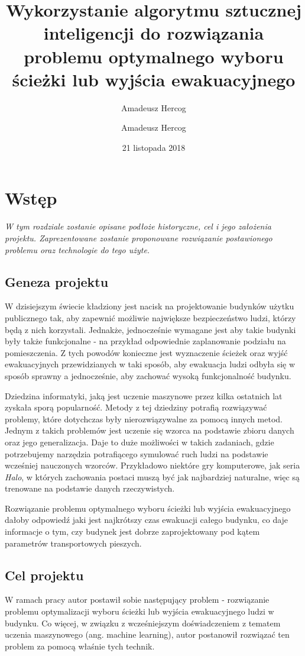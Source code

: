 \documentclass[12pt]{aghdpl}
\author{Amadeusz Hercog}
\title{Wykorzystanie algorytmu sztucznej inteligencji do rozwiązania problemu optymalnego wyboru ścieżki lub wyjścia ewakuacyjnego}
\author{Amadeusz Hercog}
\date{21 listopada 2018}
\begin{document}
	\titlepages
	
	\chapter{Wstęp}
	\textit{W tym rozdziale zostanie opisane podłoże historyczne, cel i jego założenia projektu. Zaprezentowane zostanie proponowane rozwiązanie postawionego problemu oraz technologie do tego użyte.}
	
		\section{Geneza projektu}	
		W dzisiejszym świecie kładziony jest nacisk na projektowanie budynków użytku publicznego tak, aby zapewnić możliwie największe bezpieczeństwo ludzi, którzy będą z nich korzystali. Jednakże, jednocześnie wymagane jest aby takie budynki były także funkcjonalne - na przykład odpowiednie zaplanowanie podziału na pomieszczenia. Z tych powodów konieczne jest wyznaczenie ścieżek oraz wyjść ewakuacyjnych przewidzianych w taki sposób, aby ewakuacja ludzi odbyła się w sposób sprawny a jednocześnie, aby zachować wysoką funkcjonalność budynku.
		
		Dziedzina informatyki, jaką jest uczenie maszynowe przez kilka ostatnich lat zyskała sporą popularność. Metody z tej dziedziny potrafią rozwiązywać problemy, które dotychczas były nierozwiązywalne za pomocą innych metod. Jednym z takich problemów jest uczenie się wzorca na podstawie zbioru danych oraz jego generalizacja. Daje to duże możliwości w takich zadaniach, gdzie potrzebujemy narzędzia potrafiącego symulować ruch ludzi na podstawie wcześniej nauczonych wzorców. Przykładowo niektóre gry komputerowe, jak seria \textit{Halo}, w których zachowania postaci muszą być jak najbardziej naturalne, więc są trenowane na podstawie danych rzeczywistych.
		
		Rozwiązanie problemu optymalnego wyboru ścieżki lub wyjścia ewakuacyjnego dałoby odpowiedź jaki jest najkrótszy czas ewakuacji całego budynku, co daje informacje o tym, czy budynek jest dobrze zaprojektowany pod kątem parametrów transportowych pieszych.
	
		\section{Cel projektu}	
		 W ramach pracy autor postawił sobie następujący problem - rozwiązanie problemu optymalizacji wyboru ścieżki lub wyjścia ewakuacyjnego ludzi w budynku. Co więcej, w związku z wcześniejszym doświadczeniem z tematem uczenia maszynowego (ang. machine learning), autor postanowił rozwiązać ten problem za pomocą właśnie tych technik.
		
\end{document}
